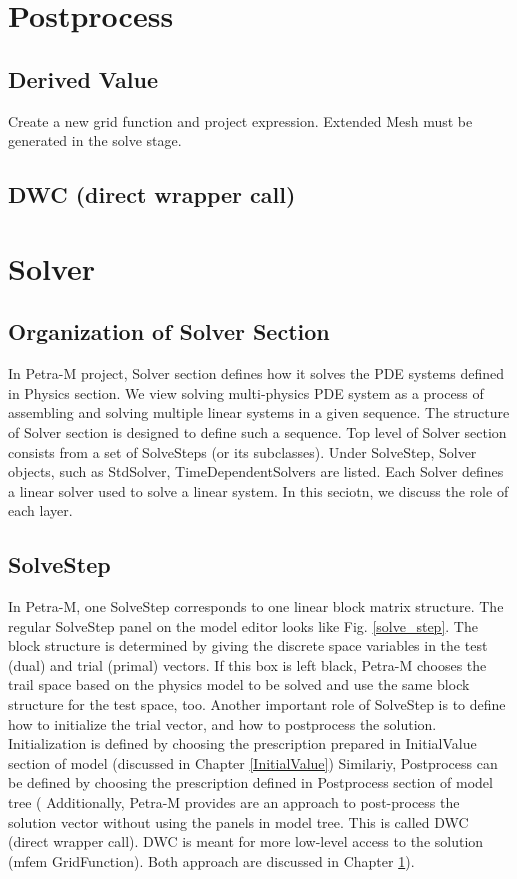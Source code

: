 \documentclass[11pt,a4paper,final]{report}
\begin{document}
\chapter{Postprocess}
\label{Postprocess}       
\section{Derived Value}     
Create a new grid function and project expression.
Extended Mesh must be generated in the solve stage.

\section{DWC (direct wrapper call)}

\chapter{Solver}
\section{Organization of Solver Section}
In Petra-M project, Solver section defines how it solves the PDE systems defined in Physics section. 
We view solving multi-physics PDE system as a process of assembling and solving multiple linear systems in a given sequence. 
The structure of Solver section is designed to define such a sequence. 
Top level of Solver section consists from a set of SolveSteps (or its subclasses). 
Under SolveStep, Solver objects, such as StdSolver, TimeDependentSolvers are listed. 
Each Solver defines a linear solver used to solve a linear system. 
In this seciotn, we discuss the role of each layer. 

\section{SolveStep}
In Petra-M, one SolveStep corresponds to one linear block matrix structure. 
The regular SolveStep panel on the model editor looks like Fig. \ref{solve_step}.
The block structure is determined by giving the discrete space variables in the test (dual) and trial  (primal) vectors. 
If this box is left black, Petra-M chooses the trail space based on the physics model to be solved and use the same block structure for the test space, too.
Another important role of SolveStep is to define how to initialize the trial vector, and how to postprocess the solution.
Initialization is defined by choosing the prescription prepared in InitialValue section of model (discussed in Chapter \ref{InitialValue})
Similariy, Postprocess can be defined by choosing the prescription defined in Postprocess section of model tree (
Additionally, Petra-M provides are an approach to post-process the solution vector without using the panels in model tree. This is called DWC (direct wrapper call).
DWC is meant for more low-level access to the solution (mfem GridFunction). 
Both approach are discussed in Chapter \ref{Postprocess}). 
\end{document}
